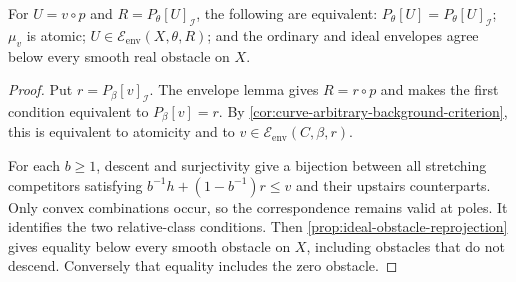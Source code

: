 \begin{corollary}\label{curve-map:all-obstacles}
For $U=v\circ p$ and $R=P_\theta[U]_{\mathcal I}$, the following
are equivalent: $P_\theta[U]=P_\theta[U]_{\mathcal I}$;
$\mu_v$ is atomic; $U\in\mathcal E_{\mathrm{env}}(X,\theta,R)$;
and the ordinary and ideal envelopes agree below every smooth
real obstacle on $X$.
\end{corollary}
\begin{proof}
Put $r=P_\beta[v]_{\mathcal I}$. The envelope lemma gives
$R=r\circ p$ and makes the first condition equivalent to
$P_\beta[v]=r$. By \cref{cor:curve-arbitrary-background-criterion},
this is equivalent to atomicity and to
$v\in\mathcal E_{\mathrm{env}}(C,\beta,r)$.

For each $b\geq1$, descent and surjectivity give a bijection
between all stretching competitors satisfying
$b^{-1}h+(1-b^{-1})r\leq v$ and their upstairs counterparts.
Only convex combinations occur, so the correspondence remains
valid at poles. It identifies the two relative-class conditions.
Then \cref{prop:ideal-obstacle-reprojection} gives equality below
every smooth obstacle on $X$, including obstacles that do not
descend. Conversely that equality includes the zero obstacle.
\end{proof}
